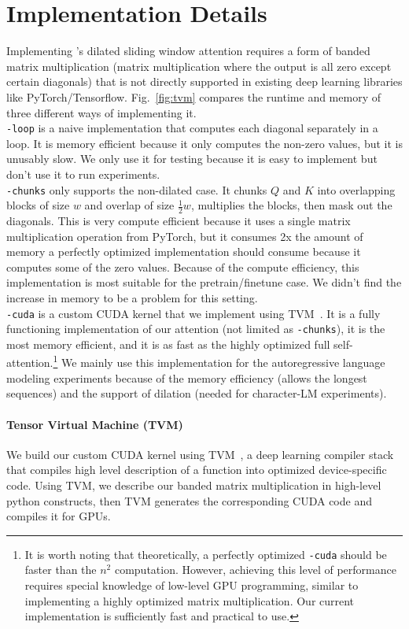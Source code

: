 \section{Implementation Details}
\label{sec:tvm_details}

Implementing \model's dilated sliding window attention requires a form
of banded matrix multiplication (matrix multiplication where the output
is all zero except certain diagonals) that is not directly supported in 
existing deep learning libraries like PyTorch/Tensorflow. 
Fig.~\ref{fig:tvm} compares the runtime and memory of three different ways of implementing
it. \\
\texttt{\model-loop} is a naive implementation that computes each diagonal separately in a loop. 
It is memory efficient because it only computes the non-zero values, but 
it is unusably slow. We only use it for testing because it is easy to implement but don't use 
it to run experiments. \\
\texttt{\model-chunks} only supports the non-dilated case. It chunks $Q$ and $K$ into 
overlapping blocks of size $w$ and overlap of size $\frac{1}{2}w$, multiplies the blocks, 
then mask out the diagonals. This is very compute efficient because it uses
a single matrix multiplication operation from PyTorch, but it consumes 2x the amount of memory
a perfectly optimized implementation should consume because it computes some of the zero values.
Because of the compute efficiency, this implementation is most suitable for the 
pretrain/finetune case. We didn't find the increase in memory to be a problem for this setting. \\
\texttt{\model-cuda} is a custom CUDA kernel that we implement using 
TVM~\cite{tvm}. It is a fully functioning implementation of our attention (not limited as \texttt{\model-chunks}), it is the most memory efficient, 
and it is as fast as the highly optimized full self-attention.\footnote{It is worth noting that theoretically, a perfectly optimized \texttt{\model-cuda} should be faster than the $n^2$ computation. 
However, achieving this level of performance requires special knowledge of low-level GPU programming, similar to implementing a highly optimized matrix multiplication. Our current implementation is sufficiently fast and practical to use.} We mainly use this implementation for the 
autoregressive language modeling experiments because of the memory efficiency (allows the longest 
sequences) and the support of dilation (needed for character-LM experiments).


\paragraph{Tensor Virtual Machine (TVM)}
We build our custom CUDA kernel using TVM~\cite{tvm}, a deep learning compiler stack that compiles
high level description of a function into optimized device-specific code.
Using TVM, we describe our banded matrix multiplication in 
high-level python constructs, then TVM generates the corresponding CUDA code
and compiles it for GPUs.

